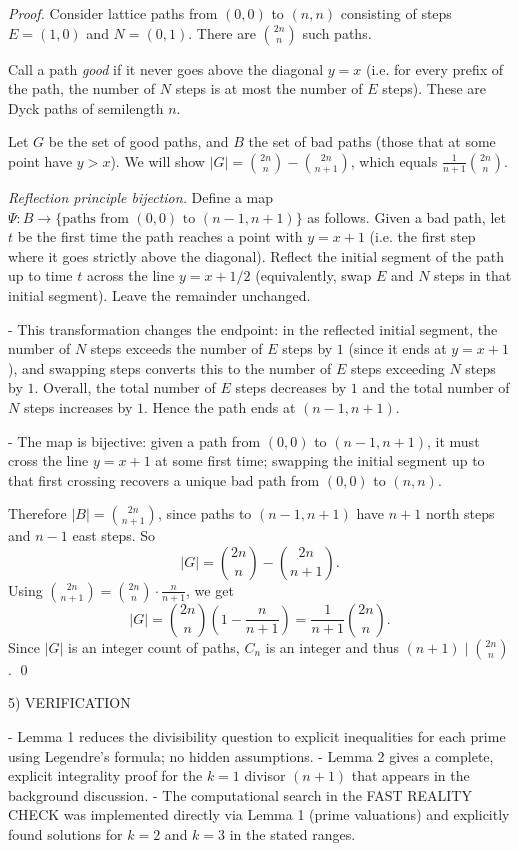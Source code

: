 \emph{Proof.}
Consider lattice paths from $(0,0)$ to $(n,n)$ consisting of steps $E=(1,0)$ and $N=(0,1)$. There are $\binom{2n}{n}$ such paths.

Call a path \emph{good} if it never goes above the diagonal $y=x$ (i.e. for every prefix of the path, the number of $N$ steps is at most the number of $E$ steps). These are Dyck paths of semilength $n$.

Let $G$ be the set of good paths, and $B$ the set of bad paths (those that at some point have $y>x$).
We will show $|G| = \binom{2n}{n} - \binom{2n}{n+1}$, which equals $\frac{1}{n+1}\binom{2n}{n}$.

\emph{Reflection principle bijection.}
Define a map $\Psi: B \to \{\text{paths from }(0,0)\text{ to }(n-1,n+1)\}$ as follows.
Given a bad path, let $t$ be the first time the path reaches a point with $y=x+1$ (i.e. the first step where it goes strictly above the diagonal). Reflect the initial segment of the path up to time $t$ across the line $y=x+1/2$ (equivalently, swap $E$ and $N$ steps in that initial segment). Leave the remainder unchanged.

- This transformation changes the endpoint: in the reflected initial segment, the number of $N$ steps exceeds the number of $E$ steps by $1$ (since it ends at $y=x+1$), and swapping steps converts this to the number of $E$ steps exceeding $N$ steps by $1$. Overall, the total number of $E$ steps decreases by $1$ and the total number of $N$ steps increases by $1$. Hence the path ends at $(n-1,n+1)$.

- The map is bijective: given a path from $(0,0)$ to $(n-1,n+1)$, it must cross the line $y=x+1$ at some first time; swapping the initial segment up to that first crossing recovers a unique bad path from $(0,0)$ to $(n,n)$.

Therefore $|B|=\binom{2n}{n+1}$, since paths to $(n-1,n+1)$ have $n+1$ north steps and $n-1$ east steps.
So
\[
|G| = \binom{2n}{n} - \binom{2n}{n+1}.
\]
Using $\binom{2n}{n+1} = \binom{2n}{n}\cdot \frac{n}{n+1}$, we get
\[
|G| = \binom{2n}{n}\left(1-\frac{n}{n+1}\right)=\frac{1}{n+1}\binom{2n}{n}.
\]
Since $|G|$ is an integer count of paths, $C_n$ is an integer and thus $(n+1)\mid\binom{2n}{n}$.
\qed

5) VERIFICATION

- Lemma 1 reduces the divisibility question to explicit inequalities for each prime using Legendre's formula; no hidden assumptions.
- Lemma 2 gives a complete, explicit integrality proof for the $k=1$ divisor $(n+1)$ that appears in the background discussion.
- The computational search in the FAST REALITY CHECK was implemented directly via Lemma 1 (prime valuations) and explicitly found solutions for $k=2$ and $k=3$ in the stated ranges.

